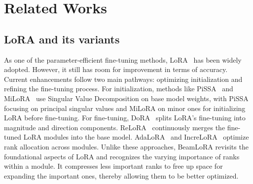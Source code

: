 \section{Related Works}
\subsection{LoRA and its variants}
As one of the parameter-efficient fine-tuning methods, LoRA~\citep{DBLP:conf/iclr/HuSWALWWC22} has been widely adopted. However, it still has room for improvement in terms of accuracy.
Current enhancements follow two main pathways: optimizing initialization and refining the fine-tuning process. For initialization, methods like PiSSA~\citep{meng2024pissa} and MiLoRA~\citep{wang2024miloraharnessingminorsingular} use Singular Value Decomposition on base model weights, with PiSSA focusing on principal singular values and MiLoRA on minor ones for initializing LoRA before fine-tuning.
For fine-tuning, DoRA~\citep{pmlr-v235-liu24bn} splits LoRA’s fine-tuning into magnitude and direction components. ReLoRA~\citep{lialin2024relora} continuously merges the fine-tuned LoRA modules into the base model.  AdaLoRA~\citep{zhang2023adaptive} and IncreLoRA~\citep{DBLP:journals/corr/abs-2308-12043} optimize rank allocation across modules.
Unlike these approaches, BeamLoRA revisits the foundational aspects of LoRA and recognizes the varying importance of ranks within a module. It compresses less important ranks to free up space for expanding the important ones, thereby allowing them to be better optimized.
